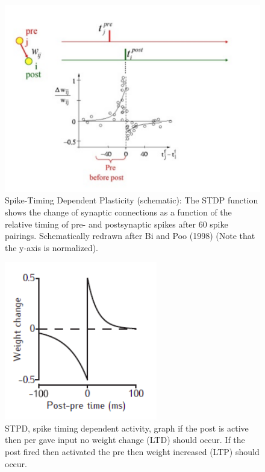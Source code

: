\documentclass[main]{subfiles}
\begin{document}
\begin{figure}[H]
    \centering
    \includegraphics[width=.9\textwidth]{03_PlasticityInTheBrain/figures/STDP.png}
    \caption{Spike-Timing Dependent Plasticity (schematic): The STDP function shows the change of synaptic connections as a function of the relative timing of pre- and postsynaptic spikes after 60 spike pairings. Schematically redrawn after Bi and Poo (1998) (Note that the y-axis is normalized).}
    \label{fig:STDP}
\end{figure}



\begin{figure}[H]
    \centering
    \includegraphics[width=.5\textwidth]{03_PlasticityInTheBrain/figures/pasted_image_6.png}
    \caption{STPD, spike timing dependent activity, graph if the post is active then per gave input no weight change (LTD) should occur. If the post fired then activated the pre then weight increased (LTP) should occur.}
    \label{fig:syn_plas1t}
\end{figure}
\end{document}
